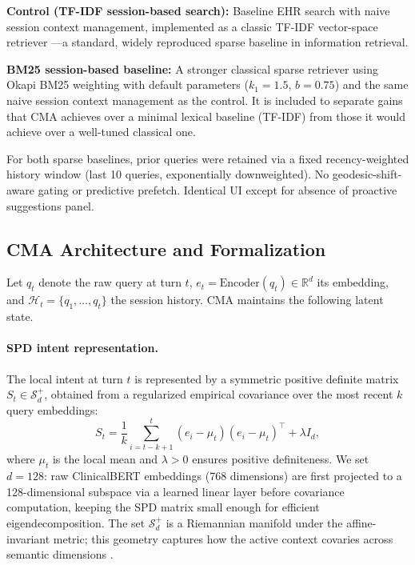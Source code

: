 \documentclass[preprint,12pt]{elsarticle}
\begin{document}
\textbf{Control (TF-IDF session-based search):} Baseline EHR search with naive session context management, implemented as a classic TF-IDF vector-space retriever \citep{salton83}---a standard, widely reproduced sparse baseline in information retrieval.

\textbf{BM25 session-based baseline:} A stronger classical sparse retriever using Okapi BM25 weighting \citep{robertson1995,robertson1976} with default parameters ($k_1=1.5$, $b=0.75$) and the same naive session context management as the control. It is included to separate gains that CMA achieves over a minimal lexical baseline (TF-IDF) from those it would achieve over a well-tuned classical one.

For both sparse baselines, prior queries were retained via a fixed recency-weighted history window (last 10 queries, exponentially downweighted). No geodesic-shift-aware gating or predictive prefetch. Identical UI except for absence of proactive suggestions panel.

\subsection{CMA Architecture and Formalization}

Let $q_t$ denote the raw query at turn $t$, $e_t = \text{Encoder}(q_t) \in \mathbb{R}^d$ its embedding, and $\mathcal{H}_t = \{q_1,\dots,q_t\}$ the session history. CMA maintains the following latent state.

\paragraph{SPD intent representation.} The local intent at turn $t$ is represented by a symmetric positive definite matrix $S_t \in \mathcal{S}_d^+$, obtained from a regularized empirical covariance over the most recent $k$ query embeddings:
\begin{equation}
S_t = \frac{1}{k}\sum_{i=t-k+1}^{t}(e_i-\mu_t)(e_i-\mu_t)^{\top} + \lambda I_d,
\label{eq:spdintent}
\end{equation}
where $\mu_t$ is the local mean and $\lambda>0$ ensures positive definiteness. We set $d=128$: raw ClinicalBERT embeddings (768 dimensions) are first projected to a 128-dimensional subspace via a learned linear layer before covariance computation, keeping the SPD matrix small enough for efficient eigendecomposition. The set $\mathcal{S}_d^+$ is a Riemannian manifold under the affine-invariant metric; this geometry captures how the active context covaries across semantic dimensions \citep{lopez2021,bronstein2017}.
\end{document}
